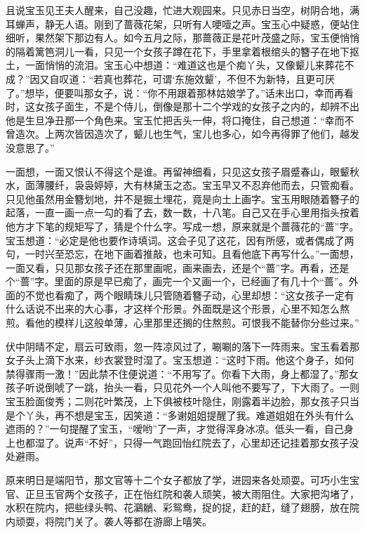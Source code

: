 且说宝玉见王夫人醒来，自己没趣，忙进大观园来。只见赤日当空，树阴合地，满耳蝉声，静无人语。刚到了蔷薇花架，只听有人哽噎之声。宝玉心中疑惑，便站住细听，果然架下那边有人。如今五月之际，那蔷薇正是花叶茂盛之际，宝玉便悄悄的隔着篱笆洞儿一看，只见一个女孩子蹲在花下，手里拿着根绾头的簪子在地下抠土，一面悄悄的流泪。宝玉心中想道：``难道这也是个痴丫头，又像颦儿来葬花不成？''因又自叹道：``若真也葬花，可谓`东施效颦'，不但不为新特，且更可厌了。''想毕，便要叫那女子，说：``你不用跟着那林姑娘学了。''话未出口，幸而再看时，这女孩子面生，不是个侍儿，倒像是那十二个学戏的女孩子之内的，却辨不出他是生旦净丑那一个角色来。宝玉忙把舌头一伸，将口掩住，自己想道：``幸而不曾造次。上两次皆因造次了，颦儿也生气，宝儿也多心，如今再得罪了他们，越发没意思了。''

一面想，一面又恨认不得这个是谁。再留神细看，只见这女孩子眉蹙春山，眼颦秋水，面薄腰纤，袅袅婷婷，大有林黛玉之态。宝玉早又不忍弃他而去，只管痴看。只见他虽然用金簪划地，并不是掘土埋花，竟是向土上画字。宝玉用眼随着簪子的起落，一直一画一点一勾的看了去，数一数，十八笔。自己又在手心里用指头按着他方才下笔的规矩写了，猜是个什么字。写成一想，原来就是个蔷薇花的``蔷''字。宝玉想道：``必定是他也要作诗填词。这会子见了这花，因有所感，或者偶成了两句，一时兴至恐忘，在地下画着推敲，也未可知。且看他底下再写什么。''一面想，一面又看，只见那女孩子还在那里画呢，画来画去，还是个``蔷''字。再看，还是个``蔷''字。里面的原是早已痴了，画完一个又画一个，已经画了有几十个``蔷''。外面的不觉也看痴了，两个眼睛珠儿只管随着簪子动，心里却想：``这女孩子一定有什么话说不出来的大心事，才这样个形景。外面既是这个形景，心里不知怎么熬煎。看他的模样儿这般单薄，心里那里还搁的住熬煎。可恨我不能替你分些过来。''

伏中阴晴不定，扇云可致雨，忽一阵凉风过了，唰唰的落下一阵雨来。宝玉看着那女子头上滴下水来，纱衣裳登时湿了。宝玉想道：``这时下雨。他这个身子，如何禁得骤雨一激！''因此禁不住便说道：``不用写了。你看下大雨，身上都湿了。''那女孩子听说倒唬了一跳，抬头一看，只见花外一个人叫他不要写了，下大雨了。一则宝玉脸面俊秀；二则花叶繁茂，上下俱被枝叶隐住，刚露着半边脸，那女孩子只当是个丫头，再不想是宝玉，因笑道：``多谢姐姐提醒了我。难道姐姐在外头有什么遮雨的？''一句提醒了宝玉，``嗳哟''了一声，才觉得浑身冰凉。低头一看，自己身上也都湿了。说声``不好''，只得一气跑回怡红院去了，心里却还记挂着那女孩子没处避雨。

原来明日是端阳节，那文官等十二个女子都放了学，进园来各处顽耍。可巧小生宝官、正旦玉官两个女孩子，正在怡红院和袭人顽笑，被大雨阻住。大家把沟堵了，水积在院内，把些绿头鸭、花鸂鶒、彩鸳鸯，捉的捉，赶的赶，缝了翅膀，放在院内顽耍，将院门关了。袭人等都在游廊上嘻笑。

